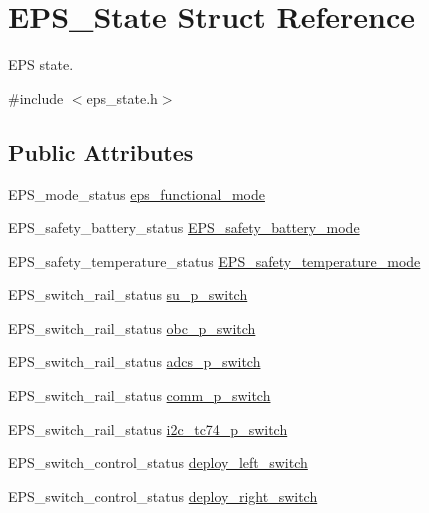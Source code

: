 \hypertarget{struct_e_p_s___state}{\section{E\-P\-S\-\_\-\-State Struct Reference}
\label{struct_e_p_s___state}
}


E\-P\-S state.  




{\ttfamily \#include $<$eps\-\_\-state.\-h$>$}

\subsection*{Public Attributes}
\begin{DoxyCompactItemize}
\item 
E\-P\-S\-\_\-mode\-\_\-status \hyperlink{struct_e_p_s___state_adaea84d5f40622960c5be9cc7363a929}{eps\-\_\-functional\-\_\-mode}
\item 
E\-P\-S\-\_\-safety\-\_\-battery\-\_\-status \hyperlink{struct_e_p_s___state_a2edb706363dbdfd7bdd6223cd4d2649d}{E\-P\-S\-\_\-safety\-\_\-battery\-\_\-mode}
\item 
E\-P\-S\-\_\-safety\-\_\-temperature\-\_\-status \hyperlink{struct_e_p_s___state_a64f6375f3b985adeb31d3f3c6f6ff140}{E\-P\-S\-\_\-safety\-\_\-temperature\-\_\-mode}
\item 
E\-P\-S\-\_\-switch\-\_\-rail\-\_\-status \hyperlink{struct_e_p_s___state_a242773a5b843bcb1f4c4620a4c84d7c2}{su\-\_\-p\-\_\-switch}
\item 
E\-P\-S\-\_\-switch\-\_\-rail\-\_\-status \hyperlink{struct_e_p_s___state_aa8b56582a0983130d495482a5b0a4bde}{obc\-\_\-p\-\_\-switch}
\item 
E\-P\-S\-\_\-switch\-\_\-rail\-\_\-status \hyperlink{struct_e_p_s___state_abe97647e722ffb5a4f04eb99dfe11b75}{adcs\-\_\-p\-\_\-switch}
\item 
E\-P\-S\-\_\-switch\-\_\-rail\-\_\-status \hyperlink{struct_e_p_s___state_addeb967b965af8a5784569eab567214c}{comm\-\_\-p\-\_\-switch}
\item 
E\-P\-S\-\_\-switch\-\_\-rail\-\_\-status \hyperlink{struct_e_p_s___state_ae6b0752b3fb97c08ed1ee44a0991e261}{i2c\-\_\-tc74\-\_\-p\-\_\-switch}
\item 
E\-P\-S\-\_\-switch\-\_\-control\-\_\-status \hyperlink{struct_e_p_s___state_a43efa80b7361c5d489ad7227619dafc4}{deploy\-\_\-left\-\_\-switch}
\item 
E\-P\-S\-\_\-switch\-\_\-control\-\_\-status \hyperlink{struct_e_p_s___state_a23b8cbc92a799459f7f4577d36f75df5}{deploy\-\_\-right\-\_\-switch}

\end{DoxyCompactItemize}
